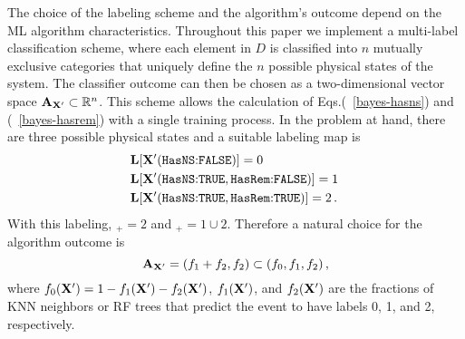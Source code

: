 The choice of the labeling scheme and the algorithm's outcome depend on the \ac{ML} algorithm characteristics. Throughout this paper we implement a multi-label classification scheme, where each
element in $D$ is classified into $n$ mutually exclusive categories that uniquely define the $n$ possible physical states of the system. The classifier outcome can then be chosen as a
two-dimensional vector space ${\bf A}_{{\bf X}'}\subset \mathbb{R}^n$. This scheme allows the calculation of Eqs.(~\ref{bayes-hasns}) and (~\ref{bayes-hasrem}) with a single training process. In
the problem at hand, there are three possible physical states and a suitable labeling
map is 
%
\begin{align}
&{\bf L}[{\bf X}'(\hbox{{{\tt HasNS}}:{{\tt FALSE}}})]=0\,\nonumber\\
&{\bf L}[{\bf X}'(\hbox{{{\tt HasNS}}:{{\tt TRUE}}},\hbox{{{\tt HasRem}}:{{\tt FALSE}}})]=1\,\\
&{\bf L}[{\bf X}'(\hbox{{{\tt HasNS}}:{{\tt TRUE}}},\hbox{{{\tt HasRem}}:{{\tt TRUE}}})]=2\,.\nonumber
\end{align}
%
With this labeling, \hasrem$_+=2$ and \hasns$_+=1\cup 2$. Therefore a natural choice for the algorithm outcome is
%
\begin{equation}
{\bf A}_{\bf X'}=(f_1+f_2,f_2)\subset (f_0,f_1,f_2)\,,
\end{equation}
%
where $f_0({\bf X}')=1-f_1({\bf X}')-f_2({\bf X}')$, $f_1({\bf X}')$, and $f_2({\bf X}')$ are the fractions of \ac{KNN} neighbors or \ac{RF} trees that predict the event to
have labels 0, 1, and 2, respectively.

%
%


